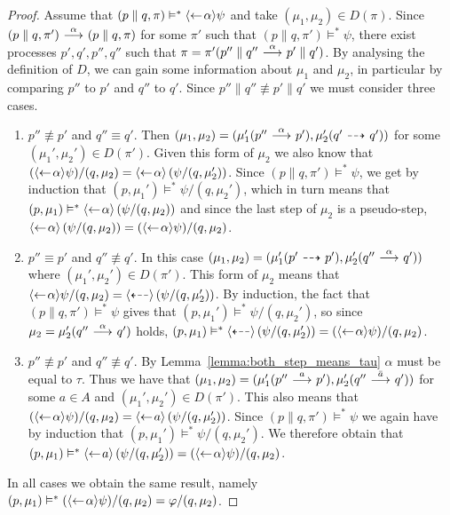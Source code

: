 \begin{proof}
    \par\nobreak
    \ltr Assume that $(p\parallel q, \pi) \vDash^* \mbox{\ensuremath{\langle\leftarrow\! \alpha \rangle}}\psi$ and take
    $(\mu_1,\mu_2)\in D(\pi)$. Since \mbox{$(p\parallel q, \pi') \ {\stackrel{{\alpha}}{\longrightarrow}}\  (p\parallel
    q, \pi)$} for some $\pi'$ such that $(p\parallel q,\pi') \vDash^* \psi$,
    there exist processes $p',q',p'',q''$ such that $\pi
    = \pi'(p''\parallel q'' \ {\stackrel{{\alpha}}{\longrightarrow}}\  p'\parallel q')$. By analysing the definition
    of $D$, we can gain some information about $\mu_1$ and $\mu_2$, in particular by
    comparing $p''$ to $p'$ and $q''$ to $q'$. Since $p''\parallel q'' \not\equiv
    p'\parallel q'$ we must consider three cases.
    \begin{enumerate}
        \item $p''\not\equiv p'$ and $q''\equiv q'$. Then $(\mu_1,\mu_2) = (\mu_1'
            (p'' \ {\stackrel{{\alpha}}{\longrightarrow}}\  p'), \mu_2'(q' \ {\stackrel{_{}}{\dashrightarrow}}\  q'))$ for some $(\mu_1',\mu_2')
            \in D(\pi')$. Given this form of $\mu_2$ we also know that $(\mbox{\ensuremath{\langle\leftarrow\! \alpha \rangle}}
            \psi) / (q,\mu_2) = \mbox{\ensuremath{\langle\leftarrow\! \alpha \rangle}} \left( \psi / (q,\mu_2') \right)$. Since
            $(p\parallel q, \pi') \vDash^* \psi$, we get by induction that $(p,\mu_1')
            \vDash^* \psi / (q,\mu_2')$, which in turn means that $(p,\mu_1)\vDash^*
            \mbox{\ensuremath{\langle\leftarrow\! \alpha \rangle}} \left(\psi / (q,\mu_2)\right)$ and since the last step of
            $\mu_2$ is a pseudo-step, $\mbox{\ensuremath{\langle\leftarrow\! \alpha \rangle}} \left(\psi / (q,\mu_2)\right)
            = (\mbox{\ensuremath{\langle\leftarrow\! \alpha \rangle}}\psi)/(q,\mu_2)$.
        \item $p''\equiv p'$ and $q''\not\equiv q'$. In this case $(\mu_1,\mu_2)
            = (\mu_1'(p'\ {\stackrel{_{}}{\dashrightarrow}}\ p'), \mu_2'(q''\ {\stackrel{{\alpha}}{\longrightarrow}}\ q'))$ where $(\mu_1',
            \mu_2') \in D(\pi')$. This form of $\mu_2$ means that $\mbox{\ensuremath{\langle\leftarrow\! \alpha \rangle}}
            \psi / (q,\mu_2) = \mbox{\ensuremath{\langle\stackrel{_{}}{\dashleftarrow}\rangle}} \left( \psi / (q,\mu_2') \right)$.
            By induction, the fact that $(p\parallel q, \pi') \vDash^* \psi$ gives
            that $(p,\mu_1') \vDash^* \psi / (q,\mu_2')$, so
            since $\mu_2 = \mu_2'(q'' \ {\stackrel{{\alpha}}{\longrightarrow}}\  q')$ holds,
            $(p,\mu_1) \vDash^*
            \mbox{\ensuremath{\langle\stackrel{_{}}{\dashleftarrow}\rangle}} \left( \psi / (q,\mu_2') \right) = (\mbox{\ensuremath{\langle\leftarrow\! \alpha \rangle}}\psi)
            / (q,\mu_2)$.
        \item $p''\not\equiv p'$ and $q''\not\equiv q'$. By Lemma~\ref{lemma:both_step_means_tau}
            $\alpha$ must be equal to $\tau$. Thus we have that $(\mu_1,\mu_2) =
            (\mu_1'(p''\ {\stackrel{{a}}{\longrightarrow}}\ p'), \mu_2'(q''\ {\stackrel{{\bar a}}{\longrightarrow}}\ q'))$ for some $a\in A$ and
            $(\mu_1',\mu_2') \in D(\pi')$. This also means that $(\mbox{\ensuremath{\langle\leftarrow\! \alpha \rangle}}\psi)
            / (q,\mu_2) = \mbox{\ensuremath{\langle\leftarrow\! a \rangle}}\left( \psi / (q,\mu_2') \right)$. Since $(p\parallel q,
            \pi') \vDash^* \psi$ we again have by induction that $(p,\mu_1')\vDash^*\psi/(q,
            \mu_2')$. We therefore obtain that $(p,\mu_1) \vDash^* \mbox{\ensuremath{\langle\leftarrow\! a \rangle}}\left(
            \psi / (q,\mu_2') \right) = (\mbox{\ensuremath{\langle\leftarrow\! \alpha \rangle}}\psi) / (q,\mu_2)$.
    \end{enumerate}
    In all cases we obtain the same result, namely $(p,\mu_1) \vDash^* (\mbox{\ensuremath{\langle\leftarrow\! \alpha \rangle}}\psi)
    / (q,\mu_2) = \varphi/(q,\mu_2)$.


\end{proof}
